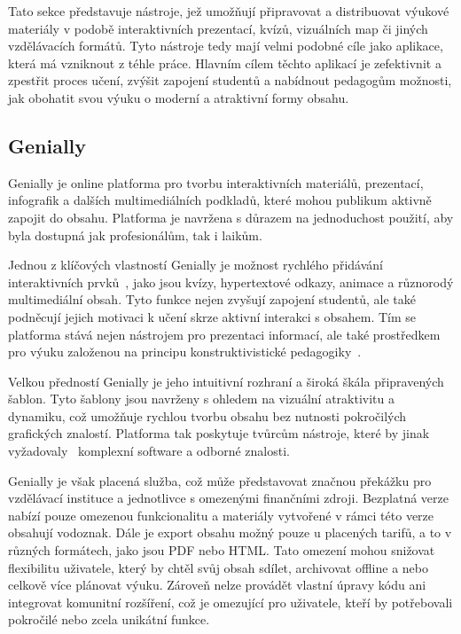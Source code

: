 Tato sekce představuje nástroje, jež umožňují připravovat a distribuovat výukové materiály v podobě interaktivních prezentací, kvízů, vizuálních map či jiných vzdělávacích formátů.
Tyto nástroje tedy mají velmi podobné cíle jako aplikace, která má vzniknout z téhle práce.
Hlavním cílem těchto aplikací je zefektivnit a zpestřit proces učení, zvýšit zapojení studentů a nabídnout pedagogům možnosti, jak obohatit svou výuku o moderní a atraktivní formy obsahu.

\subsection{Genially}

Genially je online platforma pro tvorbu interaktivních materiálů, prezentací, infografik a dalších multimediálních podkladů, které mohou publikum aktivně zapojit do obsahu.
Platforma je navržena s důrazem na jednoduchost použití, aby byla dostupná jak profesionálům, tak i laikům.

Jednou z klíčových vlastností Genially je možnost rychlého přidávání interaktivních prvků~\cite{genially}, jako jsou kvízy, hypertextové odkazy, animace a různorodý multimediální obsah. 
Tyto funkce nejen zvyšují zapojení studentů, ale také podněcují jejich motivaci k učení skrze aktivní interakci s obsahem. 
Tím se platforma stává nejen nástrojem pro prezentaci informací, ale také prostředkem pro výuku založenou na principu konstruktivistické pedagogiky~\cite{konstruktivismus}. 

Velkou předností Genially je jeho intuitivní rozhraní a široká škála připravených šablon.
Tyto šablony jsou navrženy s ohledem na vizuální atraktivitu a dynamiku, což umožňuje rychlou tvorbu obsahu bez nutnosti pokročilých grafických znalostí.
Platforma tak poskytuje tvůrcům nástroje, které by jinak vyžadovaly~\cite{genially} komplexní software a odborné znalosti.

Genially je však placená služba, což může představovat značnou překážku pro vzdělávací instituce a jednotlivce s omezenými finančními zdroji. 
Bezplatná verze nabízí pouze omezenou funkcionalitu a materiály vytvořené v rámci této verze obsahují vodoznak.
Dále je export obsahu možný pouze u placených tarifů, a to v různých formátech, jako jsou PDF nebo HTML. 
Tato omezení mohou snižovat flexibilitu uživatele, který by chtěl svůj obsah sdílet, archivovat offline a nebo celkově více plánovat výuku. 
Zároveň nelze provádět vlastní úpravy kódu ani integrovat komunitní rozšíření, což je omezující pro uživatele, kteří by potřebovali pokročilé nebo zcela unikátní funkce.


